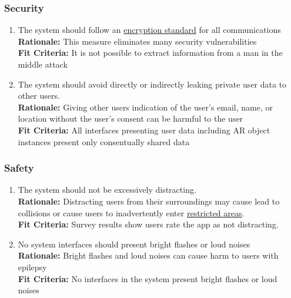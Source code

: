 \documentclass{article}
\begin{document}
\subsubsection{Security}
\label{sub:security}

\begin{enumerate}[align=left, label=\textbf{QS-SC\arabic*.}]

    \item The system should follow an \hyperref[def:encryption_standard]{encryption standard} for all communications \\
          {\bf Rationale:} This measure eliminates many security vulnerabilities \\
          {\bf Fit Criteria:} It is not possible to extract information from a man in the middle attack
    \item The system should avoid directly or indirectly leaking private user data to other users. \\
          {\bf Rationale:} Giving other users indication of the user's email, name, or location without the user's consent can be harmful to the user \\
          {\bf Fit Criteria:} All interfaces presenting user data including AR object instances present only consentually shared data
\end{enumerate}

\subsubsection{Safety}

\begin{enumerate}[align=left, label=\textbf{QS-SA\arabic*.}]
    \item The system should not be excessively distracting. \\
          {\bf Rationale:} Distracting users from their surroundings may cause lead to collisions or cause users to inadvertently enter \hyperref[def:restricted_area]{restricted areas}.\\
          {\bf Fit Criteria:} Survey results show users rate the app as not distracting.
    \item No system interfaces should present bright flashes or loud noises \\
          {\bf Rationale:} Bright flashes and loud noises can cause harm to users with epilepsy \\
          {\bf Fit Criteria:} No interfaces in the system present bright flashes or loud noises
\end{enumerate}
\end{document}
